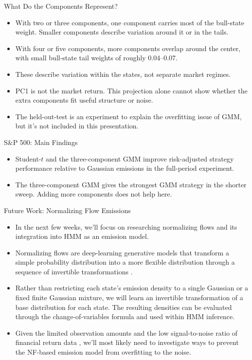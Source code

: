 \begin{frame}{What Do the Components Represent?}
\begin{itemize}
    \item With two or three components, one component carries most of the bull-state weight. Smaller components describe variation around it or in the tails.
    \item With four or five components, more components overlap around the center, with small bull-state tail weights of roughly 0.04--0.07.
    \item These describe variation within the states, not separate market regimes.
    \item PC1 is not the market return. This projection alone cannot show whether the extra components fit useful structure or noise.
    \item The held-out-test is an experiment to explain the overfitting issue of GMM, but it's not included in this presentation.
\end{itemize}
\end{frame}

\begin{frame}{S\&P 500: Main Findings}
\begin{itemize}
    \item Student-$t$ and the three-component GMM improve risk-adjusted strategy performance relative to Gaussian emissions in the full-period experiment.
    \item The three-component GMM gives the strongest GMM strategy in the shorter sweep. Adding more components does not help here.
\end{itemize}
\end{frame}


\begin{frame}{Future Work: Normalizing Flow Emissions}
\begin{itemize}
    \item In the next few weeks, we'll focus on researching normalizing flows and its integration into HMM as an emission model. 
    \item Normalizing flows are deep-learning generative models that
transform a simple probability distribution into a more flexible distribution through a sequence of
invertible transformations \cite{papamakarios2021}.
    \item Rather than restricting each state’s emission density to a single Gaussian or a fixed finite Gaussian mixture, we will learn an invertible transformation of a base
distribution for each state. The resulting densities can be evaluated through the change-of-variables
formula and used within HMM inference.
    \item Given the limited observation amounts and the low signal-to-noise ratio of financial return data \cite{gu2020}, we’ll most likely need to investigate ways to prevent the NF-based emission model from overfitting to the noise.
\end{itemize}
\end{frame}

